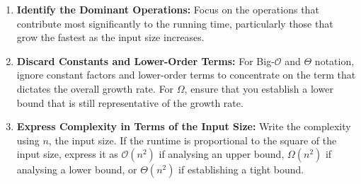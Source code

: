\begin{enumerate}
    \item \textbf{Identify the Dominant Operations:} Focus on the operations that contribute most significantly to the running time, particularly those that grow the fastest as the input size increases.
    
    \item \textbf{Discard Constants and Lower-Order Terms:} For Big-$\mathcal{O}$ and $\Theta$ notation, ignore constant factors and lower-order terms to concentrate on the term that dictates the overall growth rate. For $\Omega$, ensure that you establish a lower bound that is still representative of the growth rate.
    
    \item \textbf{Express Complexity in Terms of the Input Size:} Write the complexity using $n$, the input size. If the runtime is proportional to the square of the input size, express it as $\mathcal{O}(n^2)$ if analysing an upper bound, $\Omega(n^2)$ if analysing a lower bound, or $\Theta(n^2)$ if establishing a tight bound.
\end{enumerate}


